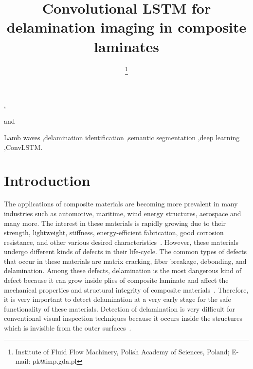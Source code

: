 \documentclass{IOS-Book-Article}
\def\hb{\hbox to 10.7 cm{}}
\begin{document}
\pagestyle{headings}
\def\thepage{}

\begin{frontmatter}              %


\title{Convolutional LSTM for delamination imaging in composite laminates}

\markboth{}{July 2022\hb}

\author[A]{
\thanks{Institute of Fluid Flow Machinery, Polish Academy of Sciences, Poland; E-mail: pk@imp.gda.pl}
},
\author[B]{ }
and
\author[B]{ }

\address[A]{Institute of Fluid Flow Machinery, Polish Academy of Sciences, Poland}
\address[B]{Institute of Fluid Flow Machinery, Polish Academy of Sciences, Poland}

\begin{abstract}

\end{abstract}

\begin{keyword}
	Lamb waves \sep delamination identification \sep semantic 
	segmentation \sep deep learning \sep ConvLSTM.
\end{keyword}
\end{frontmatter}
\markboth{July 2022\hb}{July 2022\hb}

\section{Introduction}
The applications of composite materials are becoming more prevalent in many 
industries such as automotive, maritime, wind energy structures, aerospace and 
many more.
The interest in these materials is rapidly growing due to their strength, 
lightweight, stiffness, energy-efficient fabrication, good corrosion 
resistance, and other various desired characteristics~\cite{Giurgiutiu2015}. 
However, these materials undergo different kinds of defects in their life-cycle.
The common types of defects that occur in these materials are matrix cracking, 
fiber breakage, debonding, and delamination.
Among these defects, delamination is the most dangerous kind of defect because 
it can grow inside plies of composite laminate and affect the mechanical 
properties and structural integrity of composite 
materials~\cite{Giurgiutiu2015}\cite{Sridharan2008}.
Therefore, it is very important to detect delamination at a very early stage 
for the safe functionality of these materials. 
Detection of delamination is very difficult for conventional visual inspection 
techniques because it occurs inside the structures which is invisible from the 
outer surfaces~\cite{Mei2019}.
\end{document}
